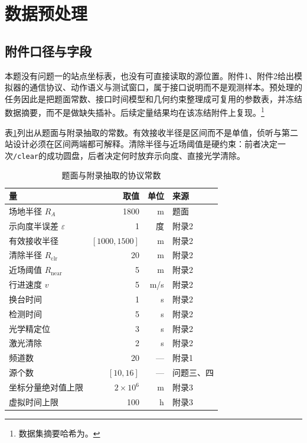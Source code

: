 \documentclass{cumcmthesis}
\begin{document}
\section{数据预处理}

\subsection{附件口径与字段}

本题没有问题一的站点坐标表，也没有可直接读取的源位置。附件1、附件2给出模拟器的通信协议、动作语义与测试窗口，属于接口说明而不是观测样本。预处理的任务因此是把题面常数、接口时间模型和几何约束整理成可复用的参数表，并冻结数据摘要，而不是做缺失插补。后续定量结果均在该冻结附件上复现。\footnote{数据集摘要哈希为。}

表\ref{tab:protocol}列出从题面与附录抽取的常数。有效接收半径是区间而不是单值，侦听与第二站设计必须在区间两端都可解释。清除半径与近场阈值是硬约束：前者决定一次\texttt{/clear}的成功圆盘，后者决定何时放弃示向度、直接光学清除。

\begin{table}[htbp]
\centering
\caption{题面与附录抽取的协议常数}
\label{tab:protocol}
\begin{tabular}{lrrl}
\toprule
量 & 取值 & 单位 & 来源 \\
\midrule
场地半径 $R_A$ & 1800 & m & 题面 \\
示向度半误差 $\varepsilon$ & 1 & 度 & 附录2 \\
有效接收半径 & $[1000,1500]$ & m & 附录2 \\
清除半径 $R_{\mathrm{clr}}$ & 20 & m & 附录2 \\
近场阈值 $R_{\mathrm{near}}$ & 5 & m & 附录2 \\
行进速度 $v$ & 5 & m/s & 附录2 \\
换台时间 & 1 & s & 附录2 \\
检测时间 & 5 & s & 附录2 \\
光学精定位 & 3 & s & 附录2 \\
激光清除 & 2 & s & 附录2 \\
频道数 & 20 & --- & 附录1 \\
源个数 & $[10,16]$ & --- & 问题三、四 \\
坐标分量绝对值上限 & $2\times 10^6$ & m & 附录3 \\
虚拟时间上限 & 100 & h & 附录3 \\
\bottomrule
\end{tabular}
\end{table}
\end{document}
